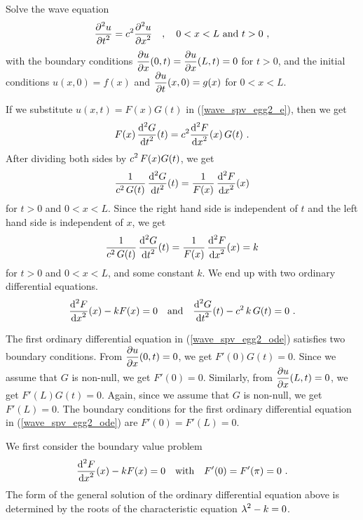 \begin{egg}
Solve the wave equation
\begin{equation} \label{wave_spv_egg2_e}
\frac{\displaystyle \partial^{2}{u}} {\displaystyle \partial t^{2}} = c^2 \frac{\displaystyle \partial^{2}{u}} {\displaystyle \partial x^{2}}  \quad ,
\quad 0 < x < L \text{ and } t>0 \ ,
\end{equation}
with the boundary conditions
$\displaystyle \frac{\partial{u}}{\partial x}(0,t) = \frac{\partial{u}}{\partial x}(L,t) = 0$ for
$t>0$, and the initial conditions
$u(x,0) = f(x)$ and $\displaystyle \frac{\partial{u}}{\partial t}(x,0) = g(x)$
for $0<x<L$.           \label{wave_spv_egg2}

If we substitute $u(x,t) = F(x)G(t)$ in (\ref{wave_spv_egg2_e}), then we get
\[
F(x)\,\frac{\displaystyle \mathrm{d}^{2}{G}} {\displaystyle \mathrm{d}{t}^{2}}(t) = c^2 \frac{\displaystyle \mathrm{d}^{2}{F}} {\displaystyle \mathrm{d}{x}^{2}}(x)\, G(t) \ .
\]
After dividing both sides by $\displaystyle c^2\,F(x)G(t)$, we get
\[
\frac{1}{c^2\,G(t)} \, \frac{\displaystyle \mathrm{d}^{2}{G}} {\displaystyle \mathrm{d}{t}^{2}}(t) =
\frac{1}{F(x)}\, \frac{\displaystyle \mathrm{d}^{2}{F}} {\displaystyle \mathrm{d}{x}^{2}}(x)
\]
for $t>0$ and $0<x<L$.
Since the right hand side is independent of $t$ and the left hand side
is independent of $x$, we get
\[
\frac{1}{c^2\,G(t)} \, \frac{\displaystyle \mathrm{d}^{2}{G}} {\displaystyle \mathrm{d}{t}^{2}}(t) = \frac{1}{F(x)}\,
\frac{\displaystyle \mathrm{d}^{2}{F}} {\displaystyle \mathrm{d}{x}^{2}}(x) = k
\]
for $t>0$ and $0<x<L$, and some constant $k$.  We end up with two
ordinary differential equations.
\begin{equation} \label{wave_spv_egg2_ode}
\frac{\displaystyle \mathrm{d}^{2}{F}} {\displaystyle \mathrm{d}{x}^{2}}(x) -k F(x) = 0 \quad \text{and}
\quad \frac{\displaystyle \mathrm{d}^{2}{G}} {\displaystyle \mathrm{d}{t}^{2}}(t) - c^2\,k\,G(t) = 0 \ .
\end{equation}

The first ordinary differential equation in (\ref{wave_spv_egg2_ode})
satisfies two boundary conditions.   From
$\displaystyle \frac{\partial{u}}{\partial x}(0,t) = 0$, we get
$F'(0)G(t)=0$.  Since we assume that $G$ is non-null, we get
$F'(0)=0$.  Similarly, from $\displaystyle \frac{\partial{u}}{\partial x}(L,t) = 0$, we
get $F'(L)G(t)=0$.  Again, since we assume that $G$ is non-null, we
get $F'(L)=0$.  The boundary conditions for 
the first ordinary differential equation in
(\ref{wave_spv_egg2_ode}) are $F'(0)=F'(L)=0$.

We first consider the boundary value problem
\begin{equation} \label{wave_spv_egg2_bvp}
\frac{\displaystyle \mathrm{d}^{2}{F}} {\displaystyle \mathrm{d}{x}^{2}}(x) -k F(x) = 0 \quad \text{with} \quad F'(0)=F'(\pi)=0  \ .
\end{equation}
The form of the general solution of the ordinary differential equation
above is determined by the roots of the characteristic equation
$\displaystyle \lambda^2-k=0$.


\end{egg}
